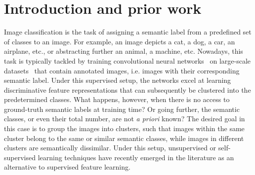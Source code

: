 \documentclass[runningheads]{llncs}
\begin{document}
\section{Introduction and prior work}
\label{sec:introduction}
Image classification is the task of assigning a semantic label from a predefined set of classes to an image. For example, an image depicts a cat, a dog, a car, an airplane, etc., or abstracting further an animal, a machine, etc. Nowadays, this task is typically tackled by training convolutional neural networks~\cite{AlexNet,VGG,ResNet,ResNeXt,InceptionNet} on large-scale datasets~\cite{ImageNet,COCO} that contain annotated images, i.e. images with their corresponding semantic label. Under this supervised setup, the networks excel at learning discriminative feature representations that can subsequently be clustered into the predetermined classes. What happens, however, when there is no access to ground-truth semantic labels at training time? Or going further, the semantic classes, or even their total number, are not {\em a priori} known? The desired goal in this case is to group the images into clusters, such that images within the same cluster belong to the same or similar semantic classes, while images in different clusters are semantically dissimilar. Under this setup, unsupervised or self-supervised learning techniques have recently emerged in the literature as an alternative to supervised feature learning. 
\end{document}

